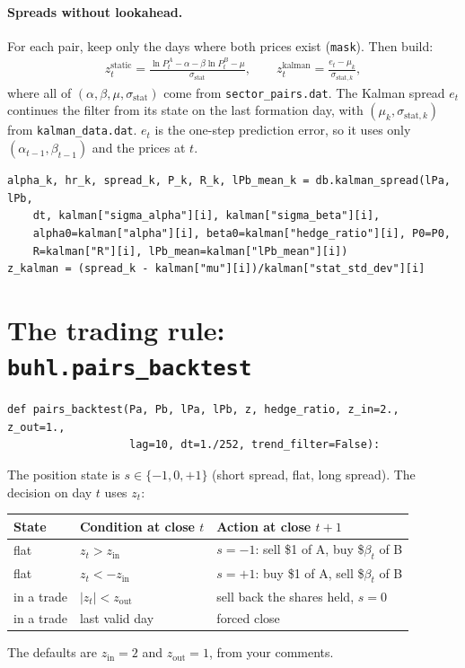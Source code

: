 \documentclass[11pt]{article}
\begin{document}
\paragraph{Spreads without lookahead.} For each pair, keep only the days
where both prices exist (\texttt{mask}). Then build:
\begin{gather*}
    z^{\text{static}}_t = \frac{\ln P^A_t - \alpha - \beta \ln P^B_t - \mu}{\sigma_{\text{stat}}},
    \qquad
    z^{\text{kalman}}_t = \frac{e_t - \mu_k}{\sigma_{\text{stat},k}},
\end{gather*}
where all of $(\alpha, \beta, \mu, \sigma_{\text{stat}})$ come from
\texttt{sector\_pairs.dat}. The Kalman spread $e_t$ continues the filter from
its state on the last formation day, with $(\mu_k, \sigma_{\text{stat},k})$
from \texttt{kalman\_data.dat}. $e_t$ is the one-step prediction error, so it
uses only $(\alpha_{t-1}, \beta_{t-1})$ and the prices at $t$.
\begin{lstlisting}
alpha_k, hr_k, spread_k, P_k, R_k, lPb_mean_k = db.kalman_spread(lPa, lPb,
    dt, kalman["sigma_alpha"][i], kalman["sigma_beta"][i],
    alpha0=kalman["alpha"][i], beta0=kalman["hedge_ratio"][i], P0=P0,
    R=kalman["R"][i], lPb_mean=kalman["lPb_mean"][i])
z_kalman = (spread_k - kalman["mu"][i])/kalman["stat_std_dev"][i]
\end{lstlisting}

\section{The trading rule: \texttt{buhl.pairs\_backtest}}

\begin{lstlisting}
def pairs_backtest(Pa, Pb, lPa, lPb, z, hedge_ratio, z_in=2., z_out=1.,
                   lag=10, dt=1./252, trend_filter=False):
\end{lstlisting}

The position state is $s \in \{-1, 0, +1\}$ (short spread, flat, long spread).
The decision on day $t$ uses $z_t$:
\begin{center}
\begin{tabular}{lll}
    \toprule
    State & Condition at close $t$ & Action at close $t+1$ \\
    \midrule
    flat & $z_t > z_{\text{in}}$ & $s=-1$: sell \$1 of A, buy \$$\beta_t$ of B \\
    flat & $z_t < -z_{\text{in}}$ & $s=+1$: buy \$1 of A, sell \$$\beta_t$ of B \\
    in a trade & $|z_t| < z_{\text{out}}$ & sell back the shares held, $s = 0$ \\
    in a trade & last valid day & forced close \\
    \bottomrule
\end{tabular}
\end{center}
The defaults are $z_{\text{in}} = 2$ and $z_{\text{out}} = 1$, from your
comments.
\end{document}

